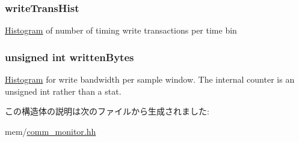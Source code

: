 \label{structCommMonitor_1_1MonitorStats_a5e5fcf61cd0db2a5a808623fadd8e23e}
\hypertarget{structCommMonitor_1_1MonitorStats_ae8f93c14ae2f3a7576899eb0630db62a}{
\subsubsection[{writeTransHist}]{ {\bf writeTransHist}}}
\label{structCommMonitor_1_1MonitorStats_ae8f93c14ae2f3a7576899eb0630db62a}
\hyperlink{classHistogram}{Histogram} of number of timing write transactions per time bin \hypertarget{structCommMonitor_1_1MonitorStats_ae02abb4b2d55a59759efa00ae4fc5f21}{
\subsubsection[{writtenBytes}]{\setlength{\rightskip}{0pt plus 5cm}unsigned int {\bf writtenBytes}}}
\label{structCommMonitor_1_1MonitorStats_ae02abb4b2d55a59759efa00ae4fc5f21}
\hyperlink{classHistogram}{Histogram} for write bandwidth per sample window. The internal counter is an unsigned int rather than a stat. 

この構造体の説明は次のファイルから生成されました:\begin{DoxyCompactItemize}
\item 
mem/\hyperlink{comm__monitor_8hh}{comm\_\-monitor.hh}\end{DoxyCompactItemize}
